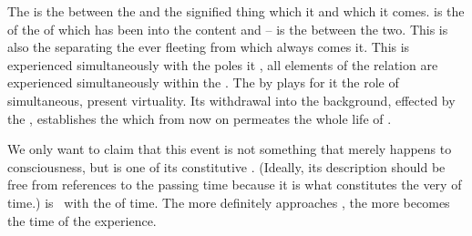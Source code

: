 The  is the  between the  and the
signified thing which it  and  which it
comes.
 is the  of the  of  which
has been  into the  content and  --  is the  between the two. This is also the
 separating the ever fleeting  from  which
always comes  it.  This  is
experienced simultaneously with the poles it , all elements of the
relation  are experienced simultaneously within the \hoa.  The
  by  plays for it the role of
simultaneous,  present virtuality. Its withdrawal into the background, effected by the
 , establishes the  which from now
on permeates the whole life of .

We only want to claim that this event is not something that merely happens to
 consciousness, but is one of its constitutive
. (Ideally, its description should be free from references to the
passing time because it is what constitutes the very  of time.)
 is \equi\ with the  of time. The more
definitely  approaches , the more
 becomes the time of the experience.


